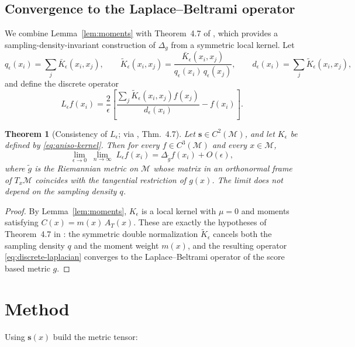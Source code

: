 \documentclass{article}
\newcommand{\M}{\mathcal{M}}
\newtheorem{theorem}{Theorem} %
\begin{document}
\subsection{Convergence to the Laplace--Beltrami operator}

We combine Lemma~\ref{lem:moments} with Theorem~4.7 of \citep{berry2016local}, which provides a sampling-density-invariant construction of \(\Delta_g\) from a symmetric local kernel. Let
\[
q_\epsilon(x_i)=\sum_{j}\bar K_\epsilon(x_i,x_j),
\qquad
\tilde K_\epsilon(x_i,x_j)=\frac{\bar K_\epsilon(x_i,x_j)}{q_\epsilon(x_i)\,q_\epsilon(x_j)},
\qquad
d_\epsilon(x_i)=\sum_j\tilde K_\epsilon(x_i,x_j),
\]
and define the discrete operator
\begin{equation}\label{eq:discrete-laplacian}
L_\epsilon f(x_i)
=\frac{2}{\epsilon}\!\left[\frac{\sum_j\tilde K_\epsilon(x_i,x_j)f(x_j)}{d_\epsilon(x_i)}-f(x_i)\right].
\end{equation}

\begin{theorem}[Consistency of \(L_\epsilon\); via \citep{berry2016local}, Thm.~4.7]\label{thm:consistency}
Let \(\mathbf{s}\in C^2(\M)\), and let \(K_\epsilon\) be defined by \eqref{eq:aniso-kernel}. Then for every \(f\in C^3(\M)\) and every \(x\in\M\),
\[
\lim_{\epsilon\to 0}\;\lim_{n\to\infty}\; L_\epsilon f(x_i)=\Delta_{\tilde g}f(x_i)+O(\epsilon),
\]
where \(\tilde g\) is the Riemannian metric on \(\M\) whose matrix in an orthonormal frame of \(T_x\M\) coincides with the tangential restriction of \(g(x)\). The limit does not depend on the sampling density \(q\).
\end{theorem}

\begin{proof}
By Lemma~\ref{lem:moments}, \(K_\epsilon\) is a local kernel with \(\mu = 0\) and moments satisfying \(C(x)=m(x)\,A_T(x)\). These are exactly the hypotheses of Theorem~4.7 in \citep{berry2016local}: the symmetric double normalization \(\tilde K_\epsilon\) cancels both the sampling density \(q\) and the moment weight \(m(x)\), and the resulting operator \eqref{eq:discrete-laplacian} converges to the Laplace--Beltrami operator of the score based metric \(g\).
\end{proof}

\section{Method}\label{sec:method}

Using $\mathbf{s}(x)$  build the metric tensor: 
\end{document}
